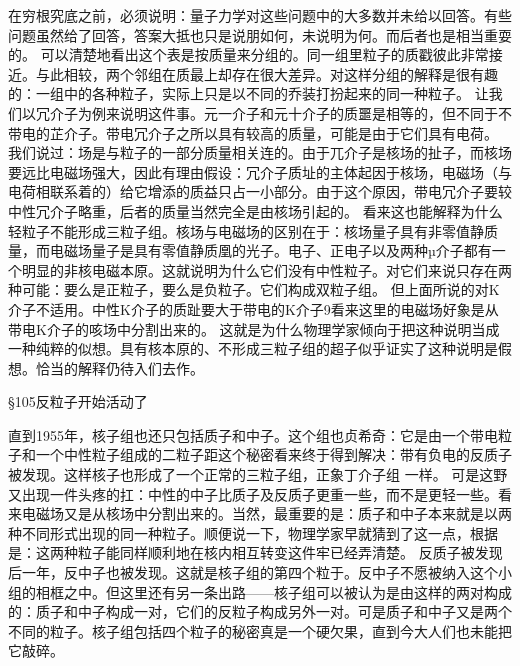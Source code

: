  
在穷根究底之前，必须说明：量子力学对这些问题中的大多数并未给以回答。有些问题虽然给了回答，答案大抵也只是说朋如何，未说明为何。而后者也是相当重耍的。
可以清楚地看出这个表是按质量来分组的。同一组里粒子的质戳彼此非常接近。与此相较，两个邻组在质最上却存在很大差异。对这样分组的解释是很有趣的：一组中的各种粒子，实际上只是以不同的乔装打扮起来的同一种粒子。
让我们以冗介子为例来说明这件事。元一介子和元十介子的质噩是相等的，但不同于不带电的芷介子。带电冗介子之所以具有较高的质量，可能是由于它们具有电荷。
我们说过：场是与粒子的一部分质量相关连的。由于兀介子是核场的扯子，而核场要远比电磁场强大，因此有理由假设：冗介子质址的主体起因于核场，电磁场（与电荷相联系着的）给它增添的质益只占一小部分。由于这个原因，带电冗介子要较中性冗介子略重，后者的质量当然完全是由核场引起的。
看来这也能解释为什么轻粒子不能形成三粒子组。核场与电磁场的区别在于：核场量子具有非零值静质量，而电磁场量子是具有零值静质凰的光子。电子、正电子以及两种µ介子都有一个明显的非核电磁本原。这就说明为什么它们没有中性粒子。对它们来说只存在两种可能：要么是正粒子，要么是负粒子。它们构成双粒子组。
但上面所说的对K介子不适用。中性K介子的质趾要大于带电的K介子9看来这里的电磁场好象是从带电K介子的咳场中分割出来的。
这就是为什么物理学家倾向于把这种说明当成一种纯粹的似想。具有核本原的、不形成三粒子组的超子似乎证实了这种说明是假想。恰当的解释仍待入们去作。

§105反粒子开始活动了

直到1955年，核子组也还只包括质子和中子。这个组也贞希奇：它是由一个带电粒子和一个中性粒子组成的二粒子距这个秘密看来终于得到解决：带有负电的反质子被发现。这样核子也形成了一个正常的三粒子组，正象丁介子组
一样。
可是这野又出现一件头疼的扛：中性的中子比质子及反质子更重一些，而不是更轻一些。看来电磁场又是从核场中分割出来的。当然，最重要的是：质子和中子本来就是以两种不同形式出现的同一种粒子。顺便说一下，物理学家早就猜到了这一点，根据是：这两种粒子能同样顺利地在核内相互转变这件牢已经弄清楚。
反质子被发现后一年，反中子也被发现。这就是核子组的第四个粒于。反中子不愿被纳入这个小组的相框之中。但这里还有另一条出路——核子组可以被认为是由这样的两对构成的：质子和中子构成一对，它们的反粒子构成另外一对。可是质子和中子又是两个不同的粒子。核子组包括四个粒子的秘密真是一个硬欠果，直到今大人们也未能把它敲碎。

